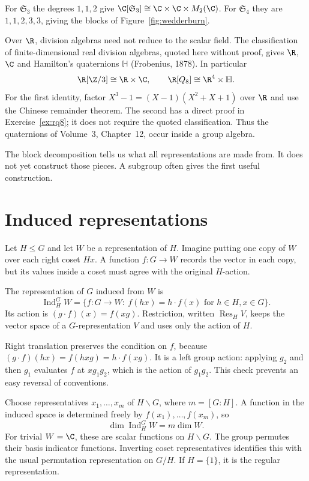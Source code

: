 \begin{example}\label{ex:wedderburnsmall}
For $\mathfrak S_3$ the degrees $1,1,2$ give
$\C[\mathfrak S_3]\cong\C\times\C\times M_2(\C)$.
For $\mathfrak S_4$ they are $1,1,2,3,3$, giving the blocks of Figure~\ref{fig:wedderburn}.

Over $\R$, division algebras need not reduce to the scalar field. The classification of finite-dimensional real division algebras, quoted here without proof, gives $\R$, $\C$ and Hamilton's quaternions $\mathbb H$ (Frobenius, 1878). In particular
\[
\R[\Z/3]\cong\R\times\C,
\qquad
\R[Q_8]\cong\R^4\times\mathbb H.
\]
For the first identity, factor $X^3-1=(X-1)(X^2+X+1)$ over $\R$ and use the Chinese remainder theorem. The second has a direct proof in Exercise~\ref{ex:rq8}; it does not require the quoted classification. Thus the quaternions of Volume~3, Chapter~12, occur inside a group algebra.
\end{example}

The block decomposition tells us what all representations are made from. It does not yet construct those pieces. A subgroup often gives the first useful construction.

\section{Induced representations}

Let $H\le G$ and let $W$ be a representation of $H$. Imagine putting one copy of $W$ over each right coset $Hx$. A function $f:G\to W$ records the vector in each copy, but its values inside a coset must agree with the original $H$-action.

\begin{definition}\label{def:induced}
The representation of $G$ induced from $W$ is
\[
\operatorname{Ind}_H^GW
=\{f:G\to W:\ f(hx)=h\cdot f(x)
\text{ for }h\in H, x\in G\}.
\]
Its action is $(g\cdot f)(x)=f(xg)$. Restriction, written $\operatorname{Res}_HV$, keeps the vector space of a $G$-representation $V$ and uses only the action of $H$.
\end{definition}

Right translation preserves the condition on $f$, because
$(g\cdot f)(hx)=f(hxg)=h\cdot f(xg)$.
It is a left group action: applying $g_2$ and then $g_1$ evaluates $f$ at $xg_1g_2$, which is the action of $g_1g_2$. This check prevents an easy reversal of conventions.

Choose representatives $x_1,\ldots,x_m$ of $H\backslash G$, where $m=[G:H]$. A function in the induced space is determined freely by $f(x_1),\ldots,f(x_m)$, so
\[
\dim\operatorname{Ind}_H^GW=m\dim W.
\]
For trivial $W=\C$, these are scalar functions on $H\backslash G$. The group permutes their basis indicator functions. Inverting coset representatives identifies this with the usual permutation representation on $G/H$. If $H=\{1\}$, it is the regular representation.


